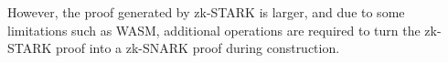 However, the proof generated by zk-STARK is larger, and due to some limitations such as WASM, additional operations are required to turn the zk-STARK proof into a zk-SNARK proof during construction.
    





